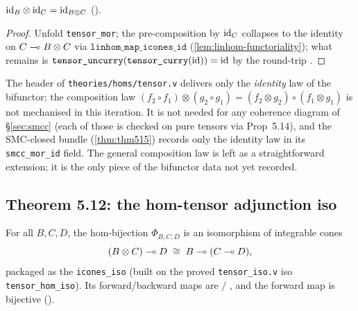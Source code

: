 \begin{lemma}\label{lem:tensor-mor-id}
\rocqok
{}
$\mathrm{id}_B \otimes \mathrm{id}_C = \mathrm{id}_{B \otimes C}$
().
\end{lemma}

\begin{proof}
Unfold \texttt{tensor\_mor}; the pre-composition by $\mathrm{id}_C$ collapses
to the identity on $C \multimap B \otimes C$ via
$\texttt{linhom\_map\_icones\_id}$
(\autoref{lem:linhom-functoriality}); what remains is
$\texttt{tensor\_uncurry}(\texttt{tensor\_curry}(\mathrm{id})) = \mathrm{id}$ by the
round-trip
.
\end{proof}

\begin{remark}
The header of \texttt{theories/homs/tensor.v} delivers only the
\emph{identity} law of the bifunctor; the composition law
$(f_2 \circ f_1) \otimes (g_2 \circ g_1) = (f_2 \otimes g_2) \circ (f_1
\otimes g_1)$ is not mechanised in this iteration. It is not needed
for any coherence diagram of \S\ref{sec:smcc} (each of those is checked
on pure tensors via Prop~5.14), and the SMC-closed bundle
(\autoref{thm:thm515}) records only the identity law in its
\texttt{smcc\_mor\_id} field. The general composition law is left as a
straightforward extension; it is the only piece of the bifunctor data
not yet recorded.
\end{remark}

\subsection{Theorem 5.12: the hom-tensor adjunction iso}%
\label{sec:thm512}

\begin{theorem}\label{thm:thm512}
\rocqok
{}
For all $B, C, D$, the hom-bijection $\Phi_{B,C,D}$ is an isomorphism
of integrable cones
\[
  (B \otimes C) \multimap D \;\cong\; B \multimap (C \multimap D),
\]
packaged as the \texttt{icones\_iso}
 (built on the proved
\texttt{tensor\_iso.v} iso \texttt{tensor\_hom\_iso}). Its
forward/backward maps are
 /
, and the forward map is
bijective ().
\end{theorem}


